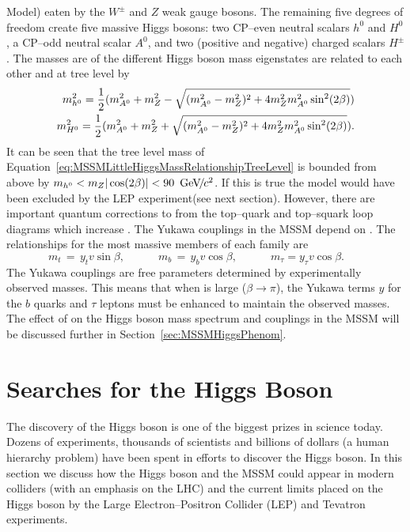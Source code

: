 Model) eaten by the $W^\pm$ and $Z$ weak gauge bosons.  The remaining five
degrees of freedom create five massive Higgs bosons: two CP--even neutral
scalars $h^0$ and $H^0$, a CP--odd neutral scalar $A^0$, and two (positive and
negative) charged scalars $H^\pm$.  The masses are of the different Higgs boson mass
eigenstates are related to each other and \tanb at tree level by
\begin{eqnarray}
  m_{h^0}^2 = \frac{1}{2}(m_{A^0}^2 + m_Z^2 - \sqrt{
  (m_{A^0}^2 - m_Z^2)^2 + 4m_Z^2m_{A^0}^2\sin^2(2\beta)}) 
  \label{eq:MSSMLittleHiggsMassRelationshipTreeLevel} \\
  m_{H^0}^2 = \frac{1}{2}(m_{A^0}^2 + m_Z^2 + \sqrt{
  (m_{A^0}^2 - m_Z^2)^2 + 4m_Z^2m_{A^0}^2\sin^2(2\beta)}). 
  \nonumber
\end{eqnarray}
It can be seen that the tree level mass \mhZero of
Equation~\ref{eq:MSSMLittleHiggsMassRelationshipTreeLevel} is bounded from above
by $m_{h^0} < m_Z|\cos(2\beta)| < 90~{\,\text{Ge\hspace{-.08em}V\hspace{-0.16em}/\hspace{-0.08em}}c^\text{2}}$.  If this is true the model would
have been excluded by the LEP experiment(see next section).  However, there are
important quantum corrections to \mhZero from the top--quark and top--squark
loop diagrams which increase \mhZero.  The Yukawa couplings in the MSSM depend
on \tanb.  The relationships for the most massive members of each family are
\begin{equation}
  m_t \,=\, y_t v \sin\beta
  ,
  \qquad\quad
  m_b \,=\, y_b v \cos\beta
  ,
  \qquad\quad
  m_\tau = y_\tau v \cos\beta.\phantom{xxx}
  \nonumber
\end{equation}
The Yukawa couplings are free parameters determined by experimentally observed
masses.  This means that when \tanb is large ($\beta \to \pi$), the Yukawa terms
$y$ for the $b$ quarks and $\tau$ leptons must be enhanced to maintain the
observed masses.  The effect of \tanb on the Higgs boson mass spectrum and couplings
in the MSSM will be discussed further in Section~\ref{sec:MSSMHiggsPhenom}.
%
\section{Searches for the Higgs Boson}
\label{sec:PreviousSearches} The discovery of the Higgs boson is one of the
biggest prizes in science today.  Dozens of experiments, thousands of scientists
and billions of dollars (a human hierarchy problem) have been spent in efforts
to discover the Higgs boson.  In this section we discuss how the Higgs boson and the MSSM
could appear in modern colliders (with an emphasis on the LHC) and the current
limits placed on the Higgs boson by the Large Electron--Positron Collider (LEP) and
Tevatron experiments.  
%
